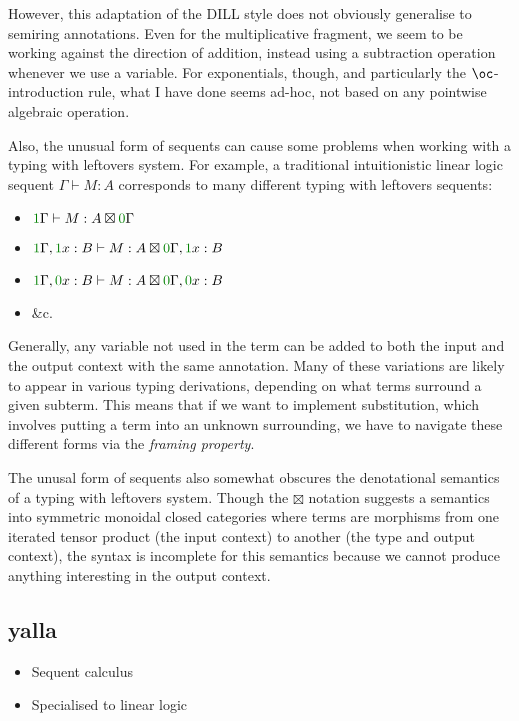 However, this adaptation of the DILL style does not obviously generalise to
semiring annotations.
Even for the multiplicative fragment, we seem to be working against the
direction of addition, instead using a subtraction operation whenever we use a
variable.
For exponentials, though, and particularly the $\oc$-introduction rule, what I
have done seems ad-hoc, not based on any pointwise algebraic operation.

Also, the unusual form of sequents can cause some problems when working with a
typing with leftovers system.
For example, a traditional intuitionistic linear logic sequent
$\Gamma \vdash M : A$ corresponds to many different typing with leftovers
sequents:
\begin{itemize}
  \item $\gr1\Gamma \vdash M : A \boxtimes \gr0\Gamma$
  \item $\gr1\Gamma, \gr1x : B \vdash M : A \boxtimes \gr0\Gamma, \gr1x : B$
  \item $\gr1\Gamma, \gr0x : B \vdash M : A \boxtimes \gr0\Gamma, \gr0x : B$
  \item \&c.
\end{itemize}

Generally, any variable not used in the term can be added to both the input and
the output context with the same annotation.
Many of these variations are likely to appear in various typing derivations,
depending on what terms surround a given subterm.
This means that if we want to implement substitution, which involves putting a
term into an unknown surrounding, we have to navigate these different forms via
the \emph{framing property}.

The unusal form of sequents also somewhat obscures the denotational semantics of
a typing with leftovers system.
Though the $\boxtimes$ notation suggests a semantics into symmetric monoidal
closed categories where terms are morphisms from one iterated tensor product
(the input context) to another (the type and output context), the syntax is
incomplete for this semantics because we cannot produce anything interesting in
the output context.

\subsection{yalla}
\begin{itemize}
  \item Sequent calculus
  \item Specialised to linear logic
\end{itemize}
